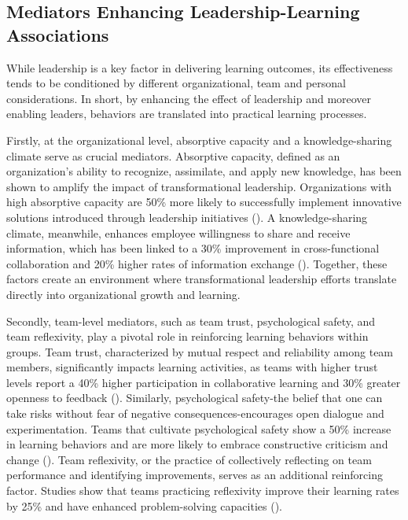 \subsection{Mediators Enhancing Leadership-Learning Associations}

While leadership is a key factor in delivering learning outcomes, its effectiveness tends to be
conditioned by different organizational, team and personal considerations. In short, by enhancing
the effect of leadership and moreover enabling leaders, behaviors are translated into practical
learning processes.

Firstly, at the organizational level, absorptive capacity and a knowledge-sharing climate serve as
crucial mediators. Absorptive capacity, defined as an organization's ability to recognize,
assimilate, and apply new knowledge, has been shown to amplify the impact of transformational
leadership. Organizations with high absorptive capacity are 50\% more likely to successfully
implement innovative solutions introduced through leadership initiatives (\cite{Imran}). A
knowledge-sharing climate, meanwhile, enhances employee willingness to share and receive
information, which has been linked to a 30\% improvement in cross-functional collaboration and 20\%
higher rates of information exchange (\cite{Camps}). Together, these factors create an environment
where transformational leadership efforts translate directly into organizational growth and
learning.

Secondly, team-level mediators, such as team trust, psychological safety, and team reflexivity, play
a pivotal role in reinforcing learning behaviors within groups. Team trust, characterized by mutual
respect and reliability among team members, significantly impacts learning activities, as teams with
higher trust levels report a 40\% higher participation in collaborative learning and 30\% greater
openness to feedback (\cite{Hirak}). Similarly, psychological safety-the belief that one can take
risks without fear of negative consequences-encourages open dialogue and experimentation. Teams that
cultivate psychological safety show a 50\% increase in learning behaviors and are more likely to
embrace constructive criticism and change (\cite{Carmeli}). Team reflexivity, or the practice of
collectively reflecting on team performance and identifying improvements, serves as an additional
reinforcing factor. Studies show that teams practicing reflexivity improve their learning rates by
25\% and have enhanced problem-solving capacities (\cite{Matsuo}).

